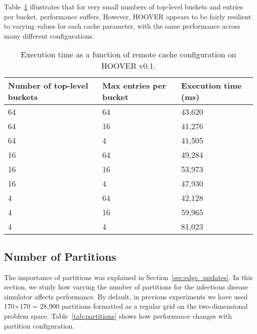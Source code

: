 Table~\ref{tab:cache} illustrates that for very small numbers of
top-level buckets and entries per bucket, performance suffers. However, HOOVER
appears to be fairly resilient to varying values for each cache parameter, with
the same performance across many different configurations.

\begin{table}
\centering
\begin{tabularx}{\textwidth}{ | X | X | X | }
\hline
Number of top-level buckets & Max entries per bucket & Execution time (ms) \\\hline
64                          & 64                     & 43,620 \\\hline
64                          & 16                     & 41,276 \\\hline
64                          & 4                      & 41,505 \\\hline
16                          & 64                     & 49,284 \\\hline
16                          & 16                     & 53,973 \\\hline
16                          & 4                      & 47,930 \\\hline
4                           & 64                     & 42,128 \\\hline
4                           & 16                     & 59,965 \\\hline
4                           & 4                      & 81,023 \\\hline
\end{tabularx}
\caption{Execution time as a function of remote cache configuration on HOOVER v0.1.}
\label{tab:cache}
\end{table}

\subsection{Number of Partitions}

The importance of partitions was explained in Section~\ref{sec:edge_updates}. In
this section, we study how varying the number of partitions for the infectious
disease simulator affects performance. By default, in previous experiments we
have used 170$\times$170 = 28,900 partitions formatted as a regular grid on the
two-dimensional problem space. Table~\ref{tab:partitions} shows how performance
changes with partition configuration.

